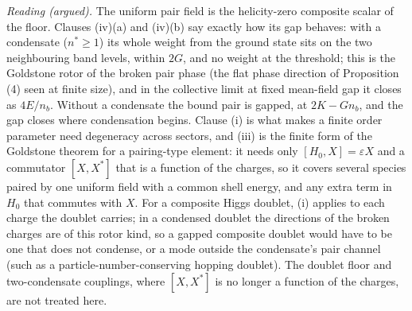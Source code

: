 \emph{Reading (argued).} The uniform pair field is the helicity-zero composite scalar of the floor. Clauses (iv)(a) and (iv)(b) say exactly how its gap behaves: with a condensate ($n^{*} \ge 1$) its whole weight from the ground state sits on the two neighbouring band levels, within $2G$, and no weight at the threshold; this is the Goldstone rotor of the broken pair phase (the flat phase direction of Proposition (4) seen at finite size), and in the collective limit at fixed mean-field gap it closes as $4E/n_{b}$. Without a condensate the bound pair is gapped, at $2K - Gn_{b}$, and the gap closes where condensation begins. Clause (i) is what makes a finite order parameter need degeneracy across sectors, and (iii) is the finite form of the Goldstone theorem for a pairing-type element: it needs only $[H_{0}, X] = \varepsilon X$ and a commutator $[X, X^{*}]$ that is a function of the charges, so it covers several species paired by one uniform field with a common shell energy, and any extra term in $H_{0}$ that commutes with $X$. For a composite Higgs doublet, (i) applies to each charge the doublet carries; in a condensed doublet the directions of the broken charges are of this rotor kind, so a gapped composite doublet would have to be one that does not condense, or a mode outside the condensate's pair channel (such as a particle-number-conserving hopping doublet). The doublet floor and two-condensate couplings, where $[X, X^{*}]$ is no longer a function of the charges, are not treated here.
